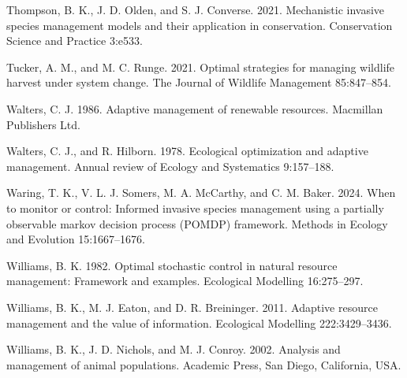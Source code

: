 \documentclass[
  11pt,
  a4paper,
]{article}
\newlength{\cslhangindent}
\newenvironment{CSLReferences}[2] %
 {\begin{list}{}{%
  \setlength{\itemindent}{0pt}
  \setlength{\leftmargin}{0pt}
  \setlength{\parsep}{0pt}
  \ifodd #1
   \setlength{\leftmargin}{\cslhangindent}
   \setlength{\itemindent}{-1\cslhangindent}
  \fi
  \setlength{\itemsep}{#2\baselineskip}}}
 {\end{list}}
\begin{document}
\begin{CSLReferences}{1}{0}
Thompson, B. K., J. D. Olden, and S. J. Converse. 2021. Mechanistic invasive species management models and their application in conservation. Conservation Science and Practice 3:e533.

Tucker, A. M., and M. C. Runge. 2021. Optimal strategies for managing wildlife harvest under system change. The Journal of Wildlife Management 85:847--854.

Walters, C. J. 1986. Adaptive management of renewable resources. Macmillan Publishers Ltd.

Walters, C. J., and R. Hilborn. 1978. Ecological optimization and adaptive management. Annual review of Ecology and Systematics 9:157--188.

Waring, T. K., V. L. J. Somers, M. A. McCarthy, and C. M. Baker. 2024. When to monitor or control: Informed invasive species management using a partially observable markov decision process (POMDP) framework. Methods in Ecology and Evolution 15:1667--1676.

Williams, B. K. 1982. Optimal stochastic control in natural resource management: Framework and examples. Ecological Modelling 16:275--297.

Williams, B. K., M. J. Eaton, and D. R. Breininger. 2011. Adaptive resource management and the value of information. Ecological Modelling 222:3429--3436.

Williams, B. K., J. D. Nichols, and M. J. Conroy. 2002. Analysis and management of animal populations. Academic Press, San Diego, California, USA.

\end{CSLReferences}
\end{document}
